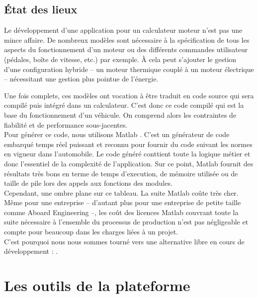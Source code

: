 \subsection{État des lieux}
Le développement d'une application pour un calculateur moteur n'est pas une
mince affaire. De nombreux modèles sont nécessaire à la spécification de tous
les aspects du fonctionnement d'un moteur ou des différents commandes
utilisateur (pédales, boîte de vitesse, etc.) par exemple. À cela peut s'ajouter
le gestion d'une configuration hybride -- un moteur thermique couplé à un moteur
électrique -- nécessitant une gestion plus pointue de l'énergie.

Une fois complets, ces modèles ont vocation à être traduit en code source qui
sera compilé puis intégré dans un calculateur. C'est donc ce code compilé qui
est la base du fonctionnement d'un véhicule. On comprend alors les contraintes
de fiabilité et de performance sous-jacentes.\\

Pour générer ce code, nous utilisons Matlab\up{\circledR} . C'est un
générateur de code embarqué temps réel puissant et reconnu pour fournir du code
suivant les normes en vigueur dans l'automobile.
Le code généré conttient toute la logique métier et donc l'essentiel de la
complexité de l'application. Sur ce point, Matlab\up{\circledR} 
fournit des résultats très bons en terme de temps d'execution, de mémoire
utilisée ou de taille de pile lors des appels aux fonctions des modules.\\

Cependant, une ombre plane sur ce tableau. La suite Matlab\up{\circledR} coûte
très cher. Même pour une entreprise -- d'autant plus pour une entreprise de
petite taille comme Aboard Engineering --, les coût des licences
Matlab\up{\circledR} couvrant toute la suite nécessaire à l'ensemble du
processus de production n'est pas négligeable et compte pour beaucoup dans les
charges liées à un projet.\\

C'est pourquoi nous nous sommes tourné vers une alternative libre en cours de
développement : .

\subsection{}


\section{Les outils de la plateforme}
\lipsum

